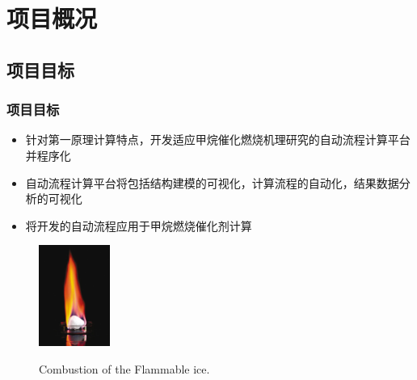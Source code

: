 \documentclass[cjk,slidestop,compress,mathserif,blue]{beamer}
\begin{document}
\section{项目概况}
\subsection{项目目标}
\frame
{
	\frametitle{项目目标}
\begin{minipage}[b]{0.58\linewidth}
	\begin{itemize}
		\setlength{\itemsep}{15pt}
		\item 针对第一原理计算特点，开发适应甲烷催化燃烧机理研究的自动流程计算平台并程序化
		\item 自动流程计算平台将包括结构建模的可视化，计算流程的自动化，结果数据分析的可视化
		\item 将开发的自动流程应用于甲烷燃烧催化剂计算%
	\end{itemize}
\end{minipage}
\hfill
\begin{minipage}[b]{0.38\linewidth}
\begin{figure}[t!]
\centering
\includegraphics[height=1.3in]{Figures/combustible_ice.jpg}
\label{fig:Combustible_ice}
\caption{\footnotesize \textrm{Combustion of the Flammable ice.}}%
\end{figure} 
\end{minipage}
}
\end{document}
